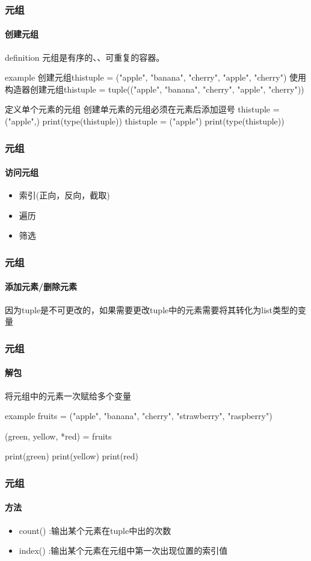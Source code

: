 \documentclass{beamer}
\begin{document}
\begin{frame}
	\frametitle{元组}
	\framesubtitle{创建元组}
	\begin{block}{definition}
		元组是有序的、、可重复的容器。
	\end{block}
	\pause
	\begin{block}{example}
		创建元组thistuple = ("apple", "banana", "cherry", "apple", "cherry")
		使用构造器创建元组thistuple = tuple(("apple", "banana", "cherry", "apple", "cherry"))
	\end{block}
	\pause
	\begin{alertblock}{定义单个元素的元组}
		创建单元素的元组必须在元素后添加逗号
		thistuple = ("apple",)
		print(type(thistuple))
		thistuple = ("apple")
		print(type(thistuple))
	\end{alertblock}

\end{frame}
\begin{frame}
	\frametitle{元组}
	\framesubtitle{访问元组}
	\begin{itemize}
		\item 索引(正向，反向，截取)
		\item 遍历
		\item 筛选
	\end{itemize}
\end{frame}

\begin{frame}
	\frametitle{元组}
	\framesubtitle{添加元素/删除元素}
	因为tuple是不可更改的，如果需要更改tuple中的元素需要将其转化为list类型的变量

\end{frame}

\begin{frame}
	\frametitle{元组}
	\framesubtitle{解包}
	将元组中的元素一次赋给多个变量
	\begin{block}{example}
		fruits = ("apple", "banana", "cherry", "strawberry", "raspberry")

		(green, yellow, *red) = fruits

		print(green)
		print(yellow)
		print(red)
	\end{block}
\end{frame}
\begin{frame}[t]
	\frametitle{元组}
	\framesubtitle{方法}
	\begin{itemize}
		\item count() :输出某个元素在tuple中出的次数
		\item index() :输出某个元素在元组中第一次出现位置的索引值
	\end{itemize}

\end{frame}
\end{document}
